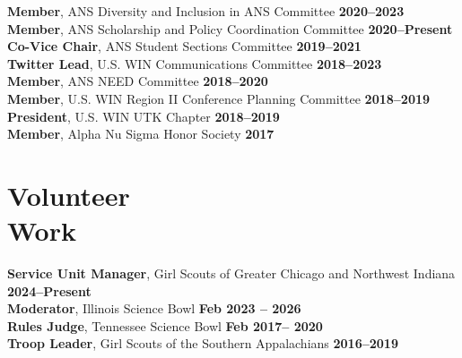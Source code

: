 \documentclass[margin,line]{resume}
\begin{document}
\begin{resume}
        \textbf{Member}, ANS Diversity and Inclusion in ANS Committee  \hfill \textbf{2020--2023}\vspace{.5mm}\\%
        \textbf{Member}, ANS Scholarship and Policy Coordination Committee  \hfill \textbf{2020--Present}\vspace{.5mm}\\%
        \textbf{Co-Vice Chair}, ANS Student Sections Committee \hfill \textbf{2019--2021}\vspace{.5mm}\\%
        \textbf{Twitter Lead}, U.S. WIN Communications Committee  \hfill \textbf{2018--2023}\vspace{.5mm}\\%
        \textbf{Member}, ANS NEED Committee \hfill \textbf{2018--2020}\vspace{.5mm}\\%
        \textbf{Member}, U.S. WIN Region II Conference Planning Committee  \hfill \textbf{2018--2019}\vspace{.5mm}\\%
        \textbf{President}, U.S. WIN UTK Chapter  \hfill \textbf{2018--2019}\vspace{.5mm}\\%
        \textbf{Member}, Alpha Nu Sigma Honor Society \hfill \textbf{2017}\vspace{.5mm}%
    
    \section{\mysidestyle Volunteer\\Work}
        \textbf{Service Unit Manager}, Girl Scouts of Greater Chicago and Northwest Indiana \hfill \textbf{2024--Present}\\
        \textbf{Moderator}, Illinois Science Bowl \hfill\textbf{Feb 2023 -- 2026}\\
        \textbf{Rules Judge}, Tennessee Science Bowl \hfill \textbf{Feb 2017-- 2020}\\
        \textbf{Troop Leader}, Girl Scouts of the Southern Appalachians \hfill \textbf{2016--2019}%
                

\end{resume}
\end{document}
